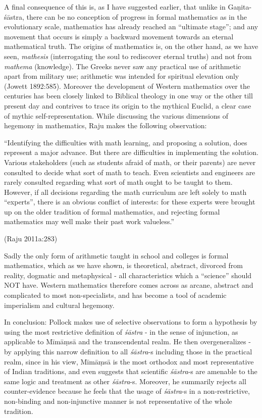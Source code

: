 A final consequence of this is, as I have suggested earlier, that unlike in Gaṇita-śāstra, there can be no conception of progress in formal mathematics as in the evolutionary scale, mathematics has already reached an ``ultimate stage''; and any movement that occurs is simply a backward movement towards an eternal mathematical truth. The origins of mathematics is, on the other hand, as we have seen, {\sl mathesis} (interrogating the soul to rediscover eternal truths) and not from {\sl mathema} (knowledge). The Greeks never saw any practical use of arithmetic apart from military use; arithmetic was intended for spiritual elevation only (Jowett 1892:585). Moreover the development of Western mathematics over the centuries has been closely linked to Biblical theology in one way or the other till present day and contrives to trace its origin to the mythical Euclid, a clear case of mythic self-representation. While discussing the various dimensions of hegemony in mathematics, Raju makes the following observation:
\begin{myquote}
``Identifying the difficulties with math learning, and proposing a solution, does represent a major advance. But there are difficulties in implementing the solution. Various stakeholders (such as students afraid of math, or their parents) are never consulted to decide what sort of math to teach. Even scientists and engineers are rarely consulted regarding what sort of math ought to be taught to them. However, if all decisions regarding the math curriculum are left solely to math ``experts'', there is an obvious conflict of interests: for these experts were brought up on the older tradition of formal mathematics, and rejecting formal mathematics may well make their past work valueless.'' 

\hfill (Raju 2011a:283) 
\end{myquote}
Sadly the only form of arithmetic taught in school and colleges is formal mathematics, which as we have shown, is theoretical, abstract, divorced from reality, dogmatic and metaphysical - all characteristics which a ``science'' should NOT have. Western mathematics therefore comes across as arcane, abstract and complicated to most non-specialists, and has become a tool of academic imperialism and cultural hegemony.

In conclusion: Pollock makes use of selective observations to form a hypothesis by using the most restrictive definition of {\sl śāstra} - in the sense of injunction, as applicable to Mīmāṃsā and the transcendental realm. He then overgeneralizes - by applying this narrow definition to all {\sl śāstra}-s including those in the practical realm, since in his view, Mīmāṃsā is the most orthodox and most representative of Indian traditions, and even suggests that scientific {\sl śāstra}-s are amenable to the same logic and treatment as other {\sl śāstra}-s. Moreover, he summarily rejects all counter-evidence because he feels that the usage of {\sl śāstra}-s in a non-restrictive, non-binding and non-injunctive manner is not representative of the whole tradition. 

